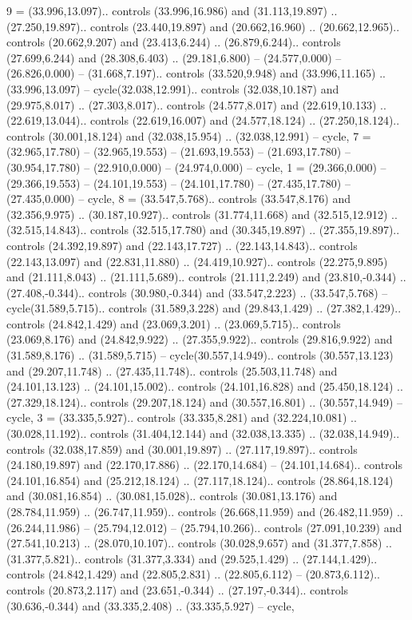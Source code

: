 {9} = {(33.996,13.097).. controls (33.996,16.986) and (31.113,19.897) .. (27.250,19.897).. controls (23.440,19.897) and (20.662,16.960) .. (20.662,12.965).. controls (20.662,9.207) and (23.413,6.244) .. (26.879,6.244).. controls (27.699,6.244) and (28.308,6.403) .. (29.181,6.800) -- (24.577,0.000) -- (26.826,0.000) -- (31.668,7.197).. controls (33.520,9.948) and (33.996,11.165) .. (33.996,13.097) -- cycle(32.038,12.991).. controls (32.038,10.187) and (29.975,8.017) .. (27.303,8.017).. controls (24.577,8.017) and (22.619,10.133) .. (22.619,13.044).. controls (22.619,16.007) and (24.577,18.124) .. (27.250,18.124).. controls (30.001,18.124) and (32.038,15.954) .. (32.038,12.991) -- cycle},
{7} = {(32.965,17.780) -- (32.965,19.553) -- (21.693,19.553) -- (21.693,17.780) -- (30.954,17.780) -- (22.910,0.000) -- (24.974,0.000) -- cycle},
{1} = {(29.366,0.000) -- (29.366,19.553) -- (24.101,19.553) -- (24.101,17.780) -- (27.435,17.780) -- (27.435,0.000) -- cycle},
{8} = {(33.547,5.768).. controls (33.547,8.176) and (32.356,9.975) .. (30.187,10.927).. controls (31.774,11.668) and (32.515,12.912) .. (32.515,14.843).. controls (32.515,17.780) and (30.345,19.897) .. (27.355,19.897).. controls (24.392,19.897) and (22.143,17.727) .. (22.143,14.843).. controls (22.143,13.097) and (22.831,11.880) .. (24.419,10.927).. controls (22.275,9.895) and (21.111,8.043) .. (21.111,5.689).. controls (21.111,2.249) and (23.810,-0.344) .. (27.408,-0.344).. controls (30.980,-0.344) and (33.547,2.223) .. (33.547,5.768) -- cycle(31.589,5.715).. controls (31.589,3.228) and (29.843,1.429) .. (27.382,1.429).. controls (24.842,1.429) and (23.069,3.201) .. (23.069,5.715).. controls (23.069,8.176) and (24.842,9.922) .. (27.355,9.922).. controls (29.816,9.922) and (31.589,8.176) .. (31.589,5.715) -- cycle(30.557,14.949).. controls (30.557,13.123) and (29.207,11.748) .. (27.435,11.748).. controls (25.503,11.748) and (24.101,13.123) .. (24.101,15.002).. controls (24.101,16.828) and (25.450,18.124) .. (27.329,18.124).. controls (29.207,18.124) and (30.557,16.801) .. (30.557,14.949) -- cycle},
{3} = {(33.335,5.927).. controls (33.335,8.281) and (32.224,10.081) .. (30.028,11.192).. controls (31.404,12.144) and (32.038,13.335) .. (32.038,14.949).. controls (32.038,17.859) and (30.001,19.897) .. (27.117,19.897).. controls (24.180,19.897) and (22.170,17.886) .. (22.170,14.684) -- (24.101,14.684).. controls (24.101,16.854) and (25.212,18.124) .. (27.117,18.124).. controls (28.864,18.124) and (30.081,16.854) .. (30.081,15.028).. controls (30.081,13.176) and (28.784,11.959) .. (26.747,11.959).. controls (26.668,11.959) and (26.482,11.959) .. (26.244,11.986) -- (25.794,12.012) -- (25.794,10.266).. controls (27.091,10.239) and (27.541,10.213) .. (28.070,10.107).. controls (30.028,9.657) and (31.377,7.858) .. (31.377,5.821).. controls (31.377,3.334) and (29.525,1.429) .. (27.144,1.429).. controls (24.842,1.429) and (22.805,2.831) .. (22.805,6.112) -- (20.873,6.112).. controls (20.873,2.117) and (23.651,-0.344) .. (27.197,-0.344).. controls (30.636,-0.344) and (33.335,2.408) .. (33.335,5.927) -- cycle},
